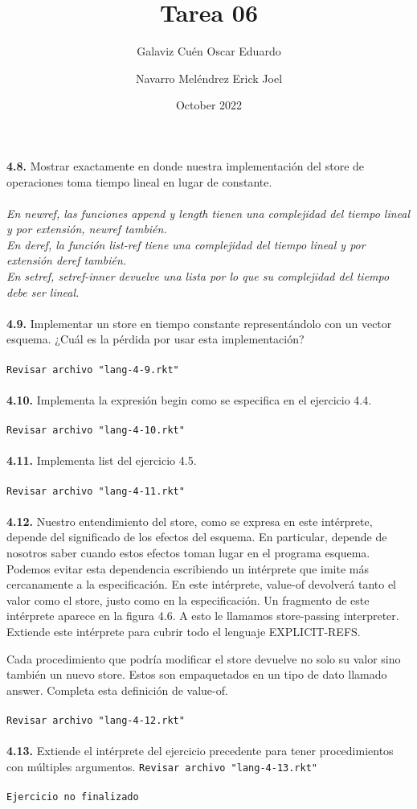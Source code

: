 \documentclass{article}
\title{\textbf{Tarea 06}}
\author{Galaviz Cuén Oscar Eduardo}
\author{Navarro Meléndrez Erick Joel}
\date{October 2022}
\begin{document}
\maketitle
\textbf{4.8.} Mostrar exactamente en donde nuestra implementación del store de operaciones toma tiempo lineal en lugar de constante.
\\
\\\textit{En newref, las funciones append y length tienen una complejidad del tiempo lineal y por extensión, newref también. }
\\\textit{En deref, la función list-ref tiene una complejidad del tiempo lineal y por extensión deref también. }
\\\textit{En setref, setref-inner devuelve una lista por lo que su complejidad del tiempo debe ser lineal.}
\\\\
\textbf{4.9.} Implementar un store en tiempo constante representándolo con un vector esquema. ¿Cuál es la pérdida por usar esta implementación?
\\\\
\texttt{Revisar archivo "lang-4-9.rkt"}
\\\\
\textbf{4.10.} Implementa la expresión begin como se especifica en el ejercicio 4.4.
\\\\
\texttt{Revisar archivo "lang-4-10.rkt"}
\\\\
\textbf{4.11.} Implementa list del ejercicio 4.5.
\\\\
\texttt{Revisar archivo "lang-4-11.rkt"}
\\\\
\textbf{4.12.} Nuestro entendimiento del store, como se expresa en este intérprete, depende del significado de los efectos del esquema. En particular, depende de nosotros saber cuando estos efectos toman lugar en el programa esquema. Podemos evitar esta dependencia escribiendo un intérprete que imite más cercanamente a la especificación. En este intérprete, value-of devolverá tanto el valor como el store, justo como en la especificación. Un fragmento de este intérprete aparece en la figura 4.6. A esto le llamamos store-passing interpreter. Extiende este intérprete para cubrir todo el lenguaje EXPLICIT-REFS.

Cada procedimiento que podría modificar el store devuelve no solo su valor sino también un nuevo store. Estos son empaquetados en un tipo de dato llamado answer. Completa esta definición de value-of.
\\\\
\texttt{Revisar archivo "lang-4-12.rkt"}
\\\\
\textbf{4.13.} Extiende el intérprete del ejercicio precedente para tener procedimientos con múltiples argumentos.
\texttt{Revisar archivo "lang-4-13.rkt"}
\\\\
\texttt{Ejercicio no finalizado}
\end{document}
